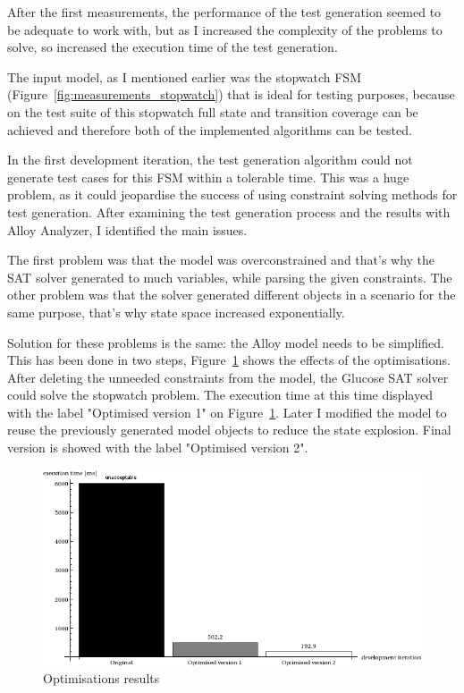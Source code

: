 After the first measurements, the performance of the test generation seemed to be adequate to work with, but as I increased the complexity of the problems to solve, so increased the execution time of the test generation. 

The input model, as I mentioned earlier was the stopwatch FSM (Figure~\ref{fig:measurements_stopwatch}) that is ideal for testing purposes, because on the test suite of this stopwatch full state and transition coverage can be achieved and therefore both of the implemented algorithms can be tested.

In the first development iteration, the test generation algorithm could not generate test cases for this FSM within a tolerable time. This was a huge problem, as it could jeopardise the success of using constraint solving methods for test generation. After examining the test generation process and the results with Alloy Analyzer, I identified the main issues.

The first problem was that the model was overconstrained and that's why the SAT solver generated to much variables, while parsing the given constraints. The other problem was that the solver generated different objects in a scenario for the same purpose, that's why state space increased exponentially.

Solution for these problems is the same: the Alloy model needs to be simplified. This has been done in two steps,  Figure~\ref{fig:measurements_optimalizations} shows the effects of the optimisations. After deleting the unneeded constraints from the model, the Glucose SAT solver could solve the stopwatch problem. The execution time at this time displayed with the label "Optimised version 1" on Figure~\ref{fig:measurements_optimalizations}. Later I modified the model to reuse the previously generated model objects to reduce the state explosion. Final version is showed with the label "Optimised version 2".

\begin{figure}[htp]
\centering
\includegraphics[scale=0.55]{figures/measurements_optimalizations}
\caption{Optimisations results}
\label{fig:measurements_optimalizations}
\end{figure}

